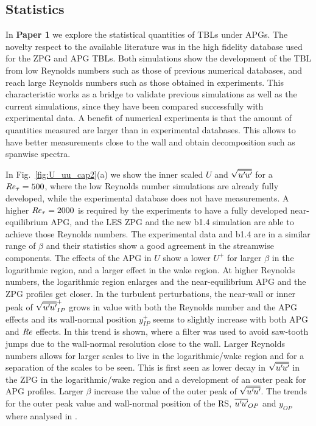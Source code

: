 \subsection{Statistics}
In \textbf{Paper 1} we explore the statistical quantities of TBLs under APGs. The novelty respect to the available literature was in the high fidelity database used for the ZPG and APG TBLs. Both simulations show the development of the TBL from low Reynolds numbers such as those of previous numerical databases, and reach large Reynolds numbers such as those obtained in experiments. This characteristic works as a bridge to validate previous simulations as well as the current simulations, since they have been compared successfully with experimental data.
A benefit of numerical experiments is that the amount of quantities measured are larger than in experimental databases. This allows to have better measurements close to the wall and obtain decomposition such as spanwise spectra.

In Fig.~\ref{fig:U_uu_cap2}(a) we show the inner scaled $U$ and $\sqrt{\overline{u^{\prime}\mkern-1.2mu u^{\prime}\mkern-1.2mu}}$ for a $\mbox{\textit{Re}}_{\tau}=500$, where the low Reynolds number simulations are already fully developed, while the experimental database does not have measurements. A higher $\mbox{\textit{Re}}_{\tau}=2000$ is required by the experiments to have a fully developed near-equilibrium APG, and the LES ZPG and the new b1.4 simulation are able to achieve those Reynolds numbers.
The experimental data and b1.4 are in a similar range of $\beta$ and their statistics show a good agreement in the streamwise components.
The effects of the APG in $U$ show a lower $U^+$ for larger $\beta$ in the logarithmic region, and a larger effect in the wake region. At higher Reynolds numbers, the logarithmic region enlarges and the near-equilibrium APG and the ZPG profiles get closer.
In the turbulent perturbations, the near-wall or inner peak of $\sqrt{\overline{u^{\prime}\mkern-1.2mu u^{\prime}\mkern-1.2mu}}^+_{IP}$ grows in value with both the Reynolds number and the APG effects and its wall-normal position $y_{IP}^+$ seems to slightly increase with both APG and $\mbox{\textit{Re}}$ effects. In \cite{Pozuelo_JFM_22} this trend is shown, where a filter was used to avoid saw-tooth jumps due to the wall-normal resolution close to the wall.
Larger Reynolds numbers allows for larger scales to live in the logarithmic/wake region and for a separation of the scales to be seen. This is first seen as lower decay in $\sqrt{\overline{u^{\prime}\mkern-1.2mu u^{\prime}\mkern-1.2mu}}$ in the ZPG in the logarithmic/wake region and a development of an outer peak for APG profiles. Larger $\beta$ increase the value of the outer peak of $\sqrt{\overline{u^{\prime}\mkern-1.2mu u^{\prime}\mkern-1.2mu}}$. The trends for the outer peak value and wall-normal position of the RS,  $\overline{u^{\prime}\mkern-1.2mu u^{\prime}\mkern-1.2mu}_{OP}$ and $y_{OP}$ where analysed in \cite{Pozuelo_JFM_22}. 



